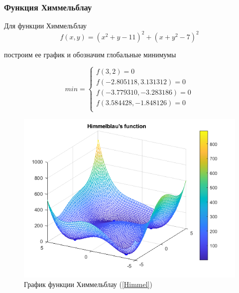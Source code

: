 \documentclass[12pt,a4paper]{article}
\begin{document}
	        \subsubsection{Функция Химмельблау}
    	        Для функции Химмельблау
    	        \begin{equation}\label{Himmel}
                    f(x, y) = (x^2 + y - 11)^2 + (x + y^2 - 7)^2
                \end{equation}
    	        
    	        построим ее график и обозначим глобальные минимумы
    	        
                \begin{equation*}
                    min = 
                     \begin{cases}
                       f(3, 2) = 0 \\
                		f(-2.805118, 3.131312) = 0\\
                		f(-3.779310, -3.283186) = 0\\
                		f(3.584428, -1.848126) = 0\\
                     \end{cases}
                \end{equation*}
    	        
    	        \begin{figure}[H]
                    \centering
                    \includegraphics[width=13cm]{Himmablau1.png}
                    \caption{График функции Химмельблау (\ref{Himmel})}
                    \label{fig:Himmel1}
                \end{figure}
                
\end{document}

